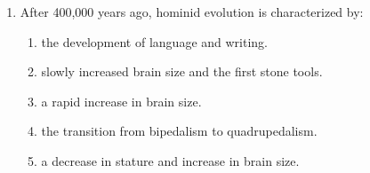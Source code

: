 \documentclass[12pt]{article}
\begin{document}
\begin{enumerate}[label=\arabic*.]
\begin{enumerate}[label=(\alph*)]
    \item pelagic; littoral
    \item pelagic; midden
    \item littoral; lacustrine
    \item midden; littoral
\end{enumerate}
\item After 400,000 years ago, hominid evolution is characterized by:
\begin{enumerate}[label=(\alph*)]
    \item the development of language and writing.
    \item slowly increased brain size and the first stone tools.
    \item a rapid increase in brain size.
    \item the transition from bipedalism to quadrupedalism.
    \item a decrease in stature and increase in brain size.
\end{enumerate}
\end{enumerate}
\end{document}
